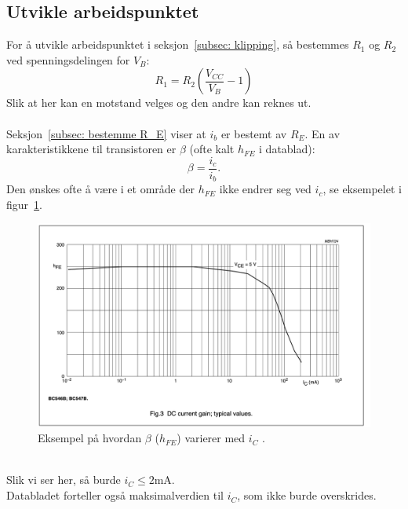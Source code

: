 \documentclass[a4paper,11pt,norsk]{article}
\begin{document}
\subsection{Utvikle arbeidspunktet}
\label{subsec: rekne arbeidspunkt}
For å utvikle arbeidspunktet i seksjon~\ref{subsec: klipping}, så bestemmes $R_1$ og $R_2$ ved spenningsdelingen for $V_B$:
\begin{equation} \label{eq: R_1}
    R_1 = R_2 \left(\frac{V_{CC}}{V_B} - 1\right)
\end{equation}
Slik at her kan en motstand velges og den andre kan reknes ut. 
\\\\
Seksjon~\ref{subsec: bestemme R_E} viser at $i_b$ er bestemt av $R_E$.
En av karakteristikkene til transistoren er $\beta$ (ofte kalt $h_{FE}$ i datablad):
\begin{equation} \label{eq: beta}
    \beta = \frac{i_c}{i_b}.
\end{equation}
Den ønskes ofte å være i et område der $h_{FE}$ ikke endrer seg ved $i_c$, se eksempelet i figur~\ref{fig: h_FE-i_C kurve}. \\
\begin{figure}[htbp]
    \centering
    \includegraphics[width=1.0\textwidth]{img/h_FE-I_C kurve.png}
    \caption{Eksempel på hvordan $\beta$ ($h_{FE}$) varierer med $i_C$ \cite{BC547B Datasheet}.}
    \label{fig: h_FE-i_C kurve}
\end{figure} \\
Slik vi ser her, så burde $i_C \leq 2$mA. \\
Databladet forteller også maksimalverdien til $i_C$, som ikke burde overskrides.
\newpage
\end{document}
